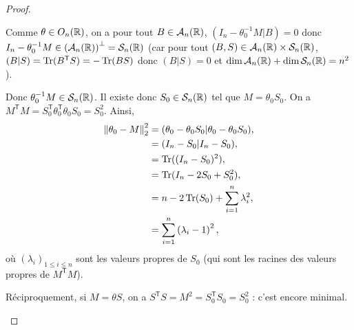 \documentclass[12pt]{article}
\begin{document}
\begin{proof}
\begin{enumerate}
		Comme $\theta\in O_n(\mathbb{R})$, on a pour tout $B\in\mathcal{A}_n(\mathbb{R})$, $(I_n-\theta_0^{-1}M|B)=0$ donc $I_n-\theta_{0}^{-1}M\in\left(\mathcal{A}_n(\mathbb{R})\right)^{\perp}=\mathcal{S}_n(\mathbb{R})$ (car pour tout $(B,S)\in\mathcal{A}_n(\mathbb{R})\times \mathcal{S}_n(\mathbb{R})$, $(B|S)=\operatorname{Tr}(B^{\mathsf{T}}S)=-\operatorname{Tr}(BS)$ donc $(B|S)=0$ et $\dim\mathcal{A}_n(\mathbb{R})+\dim\mathcal{S}_n(\mathbb{R})=n^{2}$).

		Donc $\theta_{0}^{-1}M\in\mathcal{S}_n(\mathbb{R})$. Il existe donc $S_0\in\mathcal{S}_n(\mathbb{R})$ tel que $M=\theta_0 S_0$. On a $M^{\mathsf{T}}M=S_0^{\mathsf{T}}\theta_0^{\mathsf{T}}\theta_0 S_0=S_0^{2}$. Ainsi,
		\begin{align}
			\left\lVert\theta_0-M\right\rVert_{2}^{2}
			&=(\theta_0-\theta_0 S_0|\theta_0-\theta_0 S_0),\\
			&=(I_n-S_0| I_n-S_0),\\
			&=\operatorname{Tr}((I_n-S_0)^{2}),\\
			&=\operatorname{Tr}(I_n-2S_0+S_0^{2}),\\
			&=n-2\operatorname{Tr}(S_0)+\sum_{i=1}^{n}\lambda_i^{2},\\
			&=\sum_{i=1}^{n}\left(\lambda_i-1\right)^{2},
		\end{align}
		où $(\lambda_i)_{1\leqslant i\leqslant n}$ sont les valeurs propres de $S_0$ (qui sont les racines des valeurs propres de $M^{\mathsf{T}}M$).

		Réciproquement, si $M=\theta S$, on a $S^{\mathsf{T}}S=M^{2}=S_0^{\mathsf{T}}S_0=S_{0}^{2}$ : c'est encore minimal.
	\end{enumerate}
\end{proof}
\end{document}
